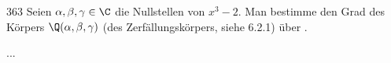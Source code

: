 \begin{algebraUE}{363}
  Seien $\alpha, \beta, \gamma \in \C$ die Nullstellen von $x^3 - 2.$ Man bestimme den Grad des Körpers $\Q(\alpha, \beta, \gamma)$ (des Zerfällungskörpers, siehe 6.2.1) über \Q.
\end{algebraUE}

\begin{solution}
...
\end{solution}
